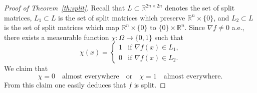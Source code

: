 \documentclass[titlepage]{amsart}
\numberwithin{equation}{section}
\theoremstyle{plain}
\theoremstyle{definition}
\theoremstyle{remark}
\newcommand{\R}{\mathbb{R}}
\newcommand{\g}{\nabla }
\begin{document}
\begin{proof}[Proof of Theorem~\ref{th:split}]
Recall that $L \subset \R^{2n \times 2n}$ denotes the set of split matrices, $L_1 \subset L$
is the set of split matrices which preserve $\R^n \times \{0\}$,  and $L_2 \subset L$ is the 
set of split matrices which map $\R^n  \times \{0\}$ to $\{0\} \times \R^n$. 
Since $\g f \ne 0$ a.e., there exists  a measurable function 
$\chi: \Omega \to \{0, 1\}$ such 
that 
\begin{equation} \label{eq:define_chi_new}
\chi(x) = \begin{cases} 1 & \text{if $\g f(x) \in L_1$,} \\
0 & \text{if $\g f(x) \in L_2$.}
\end{cases}
\end{equation}
We claim that 
\begin{equation} \label{eq:claim_chi_new}
\chi = 0 \quad \text{almost everywhere} \quad \text{or} \quad \chi = 1 \quad \text{almost everywhere.}
\end{equation}
From this claim one easily deduces that $f$ is split. 


\end{proof}
\end{document}
